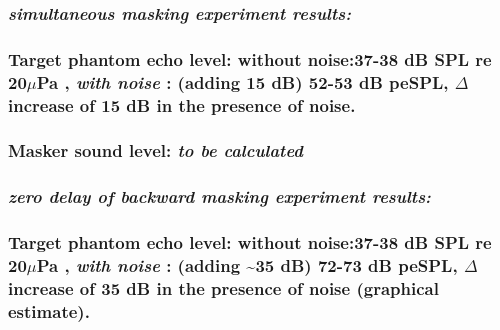 \documentclass[11pt]{article}
\begin{document}
\hypertarget{simultaneous-masking-experiment-results}{%
\subsubsection{\texorpdfstring{\emph{simultaneous masking experiment
results:}}{simultaneous masking experiment results:}}\label{simultaneous-masking-experiment-results}}

\hypertarget{target-phantom-echo-level-without-noise37-38-db-spl-re-20mupa-with-noise-adding-15-db-52-53-db-pespl-delta-increase-of-15-db-in-the-presence-of-noise.}{%
\subsubsection{\texorpdfstring{Target phantom echo level: without
noise:37-38 dB SPL re 20\(\mu\)Pa , \emph{with noise} : (adding 15 dB)
52-53 dB peSPL, \(\Delta\) increase of 15 dB in the presence of
noise.}{Target phantom echo level: without noise:37-38 dB SPL re 20\textbackslash{}muPa , with noise : (adding 15 dB) 52-53 dB peSPL, \textbackslash{}Delta increase of 15 dB in the presence of noise.}}\label{target-phantom-echo-level-without-noise37-38-db-spl-re-20mupa-with-noise-adding-15-db-52-53-db-pespl-delta-increase-of-15-db-in-the-presence-of-noise.}}

\hypertarget{masker-sound-level-to-be-calculated}{%
\subsubsection{\texorpdfstring{Masker sound level: \emph{to be
calculated}}{Masker sound level: to be calculated}}\label{masker-sound-level-to-be-calculated}}

\hypertarget{zero-delay-of-backward-masking-experiment-results}{%
\subsubsection{\texorpdfstring{\emph{zero delay of backward masking
experiment
results:}}{zero delay of backward masking experiment results:}}\label{zero-delay-of-backward-masking-experiment-results}}

\hypertarget{target-phantom-echo-level-without-noise37-38-db-spl-re-20mupa-with-noise-adding-35-db-72-73-db-pespl-delta-increase-of-35-db-in-the-presence-of-noise-graphical-estimate.}{%
\subsubsection{\texorpdfstring{Target phantom echo level: without
noise:37-38 dB SPL re 20\(\mu\)Pa , \emph{with noise} : (adding
\textasciitilde{}35 dB) 72-73 dB peSPL, \(\Delta\) increase of 35 dB in
the presence of noise (graphical
estimate).}{Target phantom echo level: without noise:37-38 dB SPL re 20\textbackslash{}muPa , with noise : (adding \textasciitilde{}35 dB) 72-73 dB peSPL, \textbackslash{}Delta increase of 35 dB in the presence of noise (graphical estimate).}}\label{target-phantom-echo-level-without-noise37-38-db-spl-re-20mupa-with-noise-adding-35-db-72-73-db-pespl-delta-increase-of-35-db-in-the-presence-of-noise-graphical-estimate.}}
\end{document}
